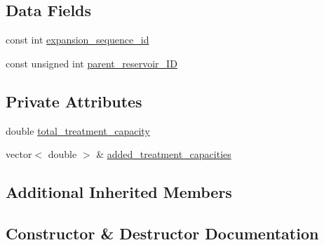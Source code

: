 \subsection*{Data Fields}
\begin{DoxyCompactItemize}
\item 
const int \mbox{\hyperlink{classSequentialJointTreatmentExpansion_adeaf6ba2bcfc4c024e332764144e3021_adeaf6ba2bcfc4c024e332764144e3021}{expansion\+\_\+sequence\+\_\+id}}
\item 
const unsigned int \mbox{\hyperlink{classSequentialJointTreatmentExpansion_a43b9e27138606bbbf8e5ef0279232a0a_a43b9e27138606bbbf8e5ef0279232a0a}{parent\+\_\+reservoir\+\_\+\+ID}}
\end{DoxyCompactItemize}
\subsection*{Private Attributes}
\begin{DoxyCompactItemize}
\item 
double \mbox{\hyperlink{classSequentialJointTreatmentExpansion_a35db39c86948882acbc30fe970f55d52_a35db39c86948882acbc30fe970f55d52}{total\+\_\+treatment\+\_\+capacity}}
\item 
vector$<$ double $>$ \& \mbox{\hyperlink{classSequentialJointTreatmentExpansion_a4c65188f0460e825e3595b9274141910_a4c65188f0460e825e3595b9274141910}{added\+\_\+treatment\+\_\+capacities}}
\end{DoxyCompactItemize}
\subsection*{Additional Inherited Members}


\subsection{Constructor \& Destructor Documentation}
\mbox{\label{classSequentialJointTreatmentExpansion_ad3ca28eaaa041be6ebbd0a4593d5c9ab_ad3ca28eaaa041be6ebbd0a4593d5c9ab}} 
